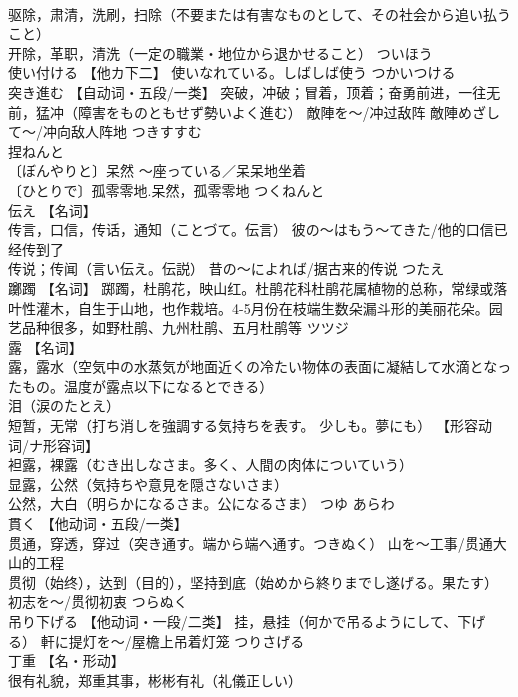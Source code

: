 \documentclass[8pt]{extreport}
\begin{document}
\begin{CJK}{UTF8}{min}
\\	驱除，肃清，洗刷，扫除（不要または有害なものとして、その社会から追い払うこと） 
\\	开除，革职，清洗（一定の職業・地位から退かせること）	ついほう	
\\	使い付ける	【他カ下二】 使いなれている。しばしば使う	つかいつける	
\\	突き進む	【自动词・五段/一类】 突破，冲破；冒着，顶着；奋勇前进，一往无前，猛冲（障害をものともせず勢いよく進む） 敵陣を～/冲过敌阵 敵陣めざして～/冲向敌人阵地	つきすすむ	
\\	捏ねんと	
\\	〔ぼんやりと〕呆然 ～座っている／呆呆地坐着 
\\	〔ひとりで〕孤零零地.呆然，孤零零地	つくねんと	
\\	伝え	【名词】 
\\	传言，口信，传话，通知（ことづて。伝言） 彼の～はもう～てきた/他的口信已经传到了 
\\	传说；传闻（言い伝え。伝説） 昔の～によれば/据古来的传说	つたえ	
\\	躑躅	【名词】 踯躅，杜鹃花，映山红。杜鹃花科杜鹃花属植物的总称，常绿或落叶性灌木，自生于山地，也作栽培。4-5月份在枝端生数朵漏斗形的美丽花朵。园艺品种很多，如野杜鹃、九州杜鹃、五月杜鹃等	ツツジ	
\\	露	【名词】 
\\	露，露水（空気中の水蒸気が地面近くの冷たい物体の表面に凝結して水滴となったもの。温度が露点以下になるとできる） 
\\	泪（涙のたとえ） 
\\	短暂，无常（打ち消しを強調する気持ちを表す。 少しも。夢にも） 【形容动词/ナ形容词】 
\\	袒露，裸露（むき出しなさま。多く、人間の肉体についていう） 
\\	显露，公然（気持ちや意見を隠さないさま） 
\\	公然，大白（明らかになるさま。公になるさま）	つゆ あらわ	
\\	貫く	【他动词・五段/一类】 
\\	贯通，穿透，穿过（突き通す。端から端へ通す。つきぬく） 山を～工事/贯通大山的工程 
\\	贯彻（始终），达到（目的），坚持到底（始めから終りまでし遂げる。果たす） 初志を～/贯彻初衷	つらぬく	
\\	吊り下げる	【他动词・一段/二类】 挂，悬挂（何かで吊るようにして、下げる） 軒に提灯を～/屋檐上吊着灯笼	つりさげる	
\\	丁重	【名・形动】 
\\	很有礼貌，郑重其事，彬彬有礼（礼儀正しい） 

\end{CJK}
\end{document}
